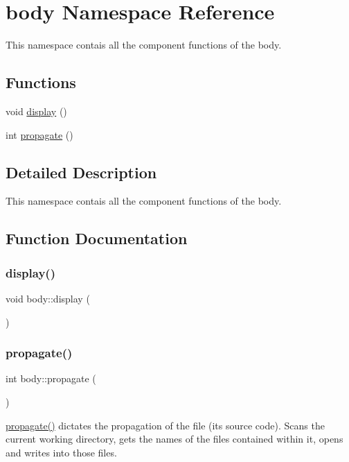 \hypertarget{namespacebody}{}\section{body Namespace Reference}
\label{namespacebody}


This namespace contais all the component functions of the body.  


\subsection*{Functions}
\begin{DoxyCompactItemize}
\item 
void \hyperlink{namespacebody_ad013160e03ba5882f2bc9d36acf6afe2}{display} ()
\item 
int \hyperlink{namespacebody_a08ea861557fb3d60985662c169ffd720}{propagate} ()
\end{DoxyCompactItemize}


\subsection{Detailed Description}
This namespace contais all the component functions of the body. 

\subsection{Function Documentation}
\mbox{\label{namespacebody_ad013160e03ba5882f2bc9d36acf6afe2}} 
\subsubsection{\texorpdfstring{display()}{display()}}
{\footnotesize\ttfamily void body\+::display (\begin{DoxyParamCaption}{ }\end{DoxyParamCaption})}

\mbox{\label{namespacebody_a08ea861557fb3d60985662c169ffd720}} 
\subsubsection{\texorpdfstring{propagate()}{propagate()}}
{\footnotesize\ttfamily int body\+::propagate (\begin{DoxyParamCaption}{ }\end{DoxyParamCaption})}

\hyperlink{namespacebody_a08ea861557fb3d60985662c169ffd720}{propagate()} dictates the propagation of the file (it\textquotesingle{}s source code). Scans the current working directory, gets the names of the files contained within it, opens and writes into those files. 